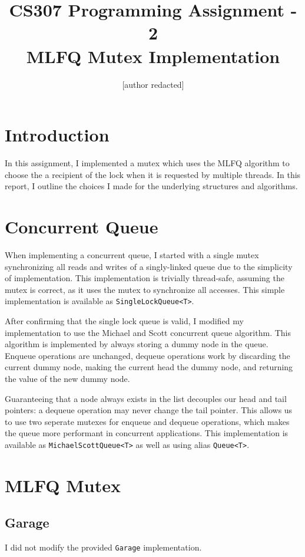 \documentclass{article}
\begin{document}
\title{{\Large CS307 Programming Assignment - 2}\\{MLFQ Mutex Implementation}}
\author{[author redacted]}
\maketitle
\begin{multicols*}{2}
\section{Introduction}
In this assignment, I implemented a mutex which uses the MLFQ algorithm to choose the a recipient of the lock when it is requested by multiple threads. In this report, I outline the choices I made for the underlying structures and algorithms.
\section{Concurrent Queue}
When implementing a concurrent queue, I started with a single mutex synchronizing all reads and writes of a singly-linked queue due to the simplicity of implementation. This implementation is trivially thread-safe, assuming the mutex is correct, as it uses the mutex to synchronize all accesses. This simple implementation is available as \verb|SingleLockQueue<T>|.

After confirming that the single lock queue is valid, I modified my implementation to use the Michael and Scott concurrent queue algorithm. This algorithm is implemented by always storing a dummy node in the queue. Enqueue operations are unchanged, dequeue operations work by discarding the current dummy node, making the current head the dummy node, and returning the value of the new dummy node. 

Guaranteeing that a node always exists in the list decouples our head and tail pointers: a dequeue operation may never change the tail pointer. This allows us to use two seperate mutexes for enqueue and dequeue operations, which makes the queue more performant in concurrent applications. This implementation is available as \verb|MichaelScottQueue<T>| as well as using alias \verb|Queue<T>|.
\section{MLFQ Mutex}
\subsection{Garage}
I did not modify the provided \verb|Garage| implementation.

\end{multicols*}
\end{document}
